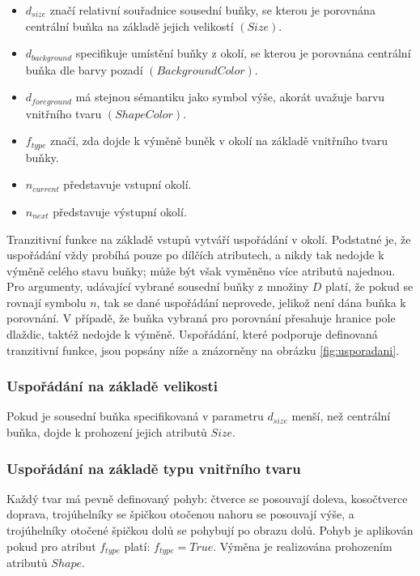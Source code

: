 \begin{itemize}
    \item $d_{size}$ značí relativní souřadnice sousední buňky, se kterou je porovnána centrální buňka na základě jejich velikostí $(Size)$.
    \item $d_{background}$ specifikuje umístění buňky z okolí, se kterou je porovnána centrální buňka dle barvy pozadí $(BackgroundColor)$.
    \item $d_{foreground}$ má stejnou sémantiku jako symbol výše, akorát uvažuje barvu vnitřního tvaru $(ShapeColor)$.
    \item $f_{type}$ značí, zda dojde k výměně buněk v okolí na základě vnitřního tvaru buňky.
    \item $n_{current}$ představuje vstupní okolí.
    \item $n_{next}$ představuje výstupní okolí.
\end{itemize}

Tranzitivní funkce na základě vstupů vytváří uspořádání v okolí. Podstatné je, že uspořádání vždy probíhá pouze po dílčích atributech, a nikdy tak nedojde k výměně celého stavu buňky; může být však vyměněno více atributů najednou. Pro argumenty, udávající vybrané sousední buňky z množiny $D$ platí, že pokud se rovnají symbolu $n$, tak se dané uspořádání neprovede, jelikož není dána buňka k porovnání. V případě, že buňka vybraná pro porovnání přesahuje hranice pole dlaždic, taktéž nedojde k výměně. Uspořádání, které podporuje definovaná tranzitivní funkce, jsou popsány níže a znázorněny na obrázku \ref{fig:usporadani}.

\subsubsection*{Uspořádání na základě velikosti}

Pokud je sousední buňka specifikovaná v parametru $d_{size}$ menší, než centrální buňka, dojde k prohození jejich atributů $Size$.

\subsubsection*{Uspořádání na základě typu vnitřního tvaru}


Každý tvar má pevně definovaný pohyb: čtverce se posouvají doleva, kosočtverce doprava, trojúhelníky se špičkou otočenou nahoru se posouvají výše, a trojúhelníky otočené špičkou dolů se pohybují po obrazu dolů. Pohyb je aplikován pokud pro atribut $f_{type}$ platí: $f_{type} = True$. Výměna je realizována prohozením atributů $Shape$.

